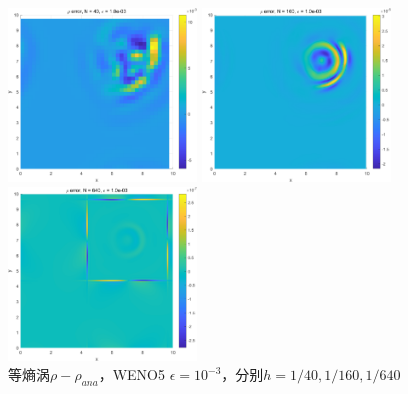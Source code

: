 \documentclass[UTF8,zihao=5]{ctexart} %
\begin{document}
\begin{figure}[H]
    \begin{minipage}[c]{0.32\linewidth}  %
        \centering
        \includegraphics[width=5cm]{Err_40_E3.png}  %
    \end{minipage}
    \hfill %
    \begin{minipage}[c]{0.32\linewidth}  %
        \centering
        \includegraphics[width=5cm]{Err_160_E3.png}  %
    \end{minipage}
    \hfill %
    \begin{minipage}[c]{0.32\linewidth}  %
        \centering
        \includegraphics[width=5cm]{Err_640_E3.png}  %
    \end{minipage}
    \caption{等熵涡$\rho-\rho_{ana}$，WENO5 $\epsilon=10^{-3}$，分别$h=1/40,1/160,1/640$}
\end{figure}
\end{document}
